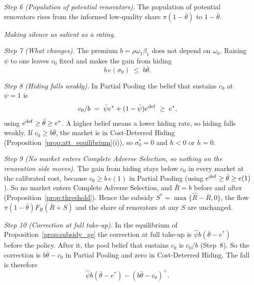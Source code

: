 \emph{Step 6 (Population of potential renovators).} The population of potential renovators rises from the informed low-quality share $\pi(1-\bar\theta)$ to $1-\bar\theta$.

\medskip\noindent\emph{Making silence as salient as a rating.}

\emph{Step 7 (What changes).} The premium $b=\rho\omega_1\beta_1$ does not depend on $\omega_0$. Raising $\psi$ to one leaves $c_0$ fixed and makes the gain from hiding
\begin{equation*}
    b\,e(\sigma_0)\;\le\;b\bar\theta.
\end{equation*}

\emph{Step 8 (Hiding falls weakly).} In Partial Pooling the belief that sustains $c_0$ at $\psi=1$ is
\begin{equation*}
    c_0/b\;=\;\hat\psi e^*+(1-\hat\psi)e^{\rm def}\;\ge\;e^*,
\end{equation*}
using $e^{\rm def}\ge\bar\theta\ge e^*$. A higher belief means a lower hiding rate, so hiding falls weakly. If $c_0\ge b\bar\theta$, the market is in Cost-Deterred Hiding (Proposition~\ref{prop:att_equilibrium}(i)), so $\sigma_0^*=0$ and $h<0$ or $h=0$.

\emph{Step 9 (No market enters Complete Adverse Selection, so nothing on the renovation side moves).} The gain from hiding stays below $c_0$ in every market at the calibrated cost, because $c_0\ge b\,e(1)$ in Partial Pooling (using $e^{\rm def}\ge\bar\theta\ge e(1)$). So no market enters Complete Adverse Selection, and $\bar R=b$ before and after (Proposition~\ref{prop:threshold}). Hence the subsidy $S^*=\max\{\hat R-\bar R,0\}$, the flow $\pi(1-\bar\theta)F_R(\bar R+S)$ and the share of renovators at any $S$ are unchanged.

\emph{Step 10 (Correction at full take-up).} In the equilibrium of Proposition~\ref{prop:subsidy_ge} the correction at full take-up is $\hat\psi b(\bar\theta-e^*)$ before the policy. After it, the pool belief that sustains $c_0$ is $c_0/b$ (Step~8). So the correction is $b\bar\theta-c_0$ in Partial Pooling and zero in Cost-Deterred Hiding. The fall is therefore
\begin{equation*}
    \hat\psi b(\bar\theta-e^*)-(b\bar\theta-c_0)^+.
\end{equation*}

